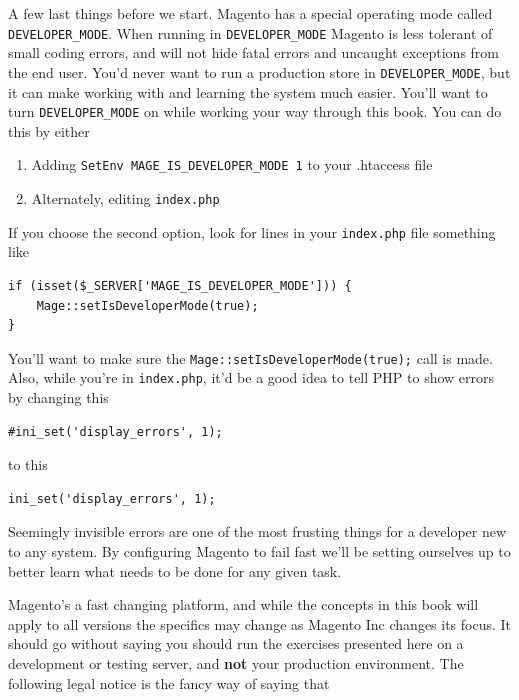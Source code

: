 \documentclass[oneside]{book}
\begin{document}
A few last things before we start.  Magento has a special operating mode called \footnotesize\texttt{DEVELOPER\_MODE}\normalsize.  When running in \footnotesize\texttt{DEVELOPER\_MODE} \normalsize  Magento is less tolerant of small coding errors, and will not hide fatal errors and uncaught exceptions from the end user.  You'd never want to run a production store in \footnotesize\texttt{DEVELOPER\_MODE}\normalsize, but it can make working with and learning the system much easier.  You'll want to turn \footnotesize\texttt{DEVELOPER\_MODE} \normalsize  on while working your way through this book.  You can do this by either

\begin{enumerate}
\item Adding \footnotesize\texttt{SetEnv MAGE\_IS\_DEVELOPER\_MODE 1} \normalsize  to your .htaccess file
\item Alternately, editing \footnotesize\texttt{index.php} \normalsize 
\end{enumerate}


If you choose the second option, look for lines in your \footnotesize\texttt{index.php} \normalsize  file something like

\begin{lstlisting}
if (isset($_SERVER['MAGE_IS_DEVELOPER_MODE'])) {
    Mage::setIsDeveloperMode(true);
}

\end{lstlisting}


You'll want to make sure the \footnotesize\texttt{Mage::setIsDeveloperMode(true);} \normalsize  call is made.  Also, while you're in \footnotesize\texttt{index.php}\normalsize, it'd be a good idea to tell PHP to show errors by changing this

\begin{lstlisting}
#ini_set('display_errors', 1);

\end{lstlisting}


to this

\begin{lstlisting}
ini_set('display_errors', 1);

\end{lstlisting}


Seemingly invisible errors are one of the most frusting things for a developer new to any system.  By configuring Magento to fail fast we'll be setting ourselves up to better learn what needs to be done for any given task.

Magento's a fast changing platform, and while the concepts in this book will apply to all versions the specifics may change as Magento Inc changes its focus.  It should go without saying you should run the exercises presented here on a development or testing server, and \textbf{not} your production environment.  The following legal notice is the fancy way of saying that
\end{document}
